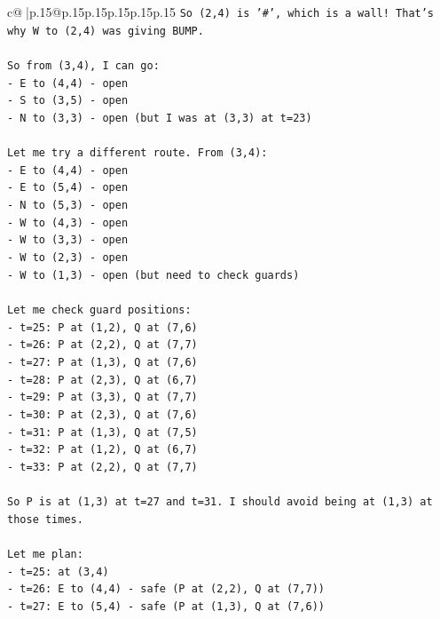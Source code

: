 \documentclass{article}
\begin{document}
{\begin{supertabular}{c@{$\;$}|p{.15\linewidth}@{}p{.15\linewidth}p{.15\linewidth}p{.15\linewidth}p{.15\linewidth}p{.15\linewidth}}
{{{\texttt{So (2,4) is '\#', which is a wall! That's why W to (2,4) was giving BUMP.} \\
\\ 
\texttt{So from (3,4), I can go:} \\
\texttt{{-} E to (4,4) {-} open} \\
\texttt{{-} S to (3,5) {-} open} \\
\texttt{{-} N to (3,3) {-} open (but I was at (3,3) at t=23)} \\
\\ 
\texttt{Let me try a different route. From (3,4):} \\
\texttt{{-} E to (4,4) {-} open} \\
\texttt{{-} E to (5,4) {-} open} \\
\texttt{{-} N to (5,3) {-} open} \\
\texttt{{-} W to (4,3) {-} open} \\
\texttt{{-} W to (3,3) {-} open} \\
\texttt{{-} W to (2,3) {-} open} \\
\texttt{{-} W to (1,3) {-} open (but need to check guards)} \\
\\ 
\texttt{Let me check guard positions:} \\
\texttt{{-} t=25: P at (1,2), Q at (7,6)} \\
\texttt{{-} t=26: P at (2,2), Q at (7,7)} \\
\texttt{{-} t=27: P at (1,3), Q at (7,6)} \\
\texttt{{-} t=28: P at (2,3), Q at (6,7)} \\
\texttt{{-} t=29: P at (3,3), Q at (7,7)} \\
\texttt{{-} t=30: P at (2,3), Q at (7,6)} \\
\texttt{{-} t=31: P at (1,3), Q at (7,5)} \\
\texttt{{-} t=32: P at (1,2), Q at (6,7)} \\
\texttt{{-} t=33: P at (2,2), Q at (7,7)} \\
\\ 
\texttt{So P is at (1,3) at t=27 and t=31. I should avoid being at (1,3) at those times.} \\
\\ 
\texttt{Let me plan:} \\
\texttt{{-} t=25: at (3,4)} \\
\texttt{{-} t=26: E to (4,4) {-} safe (P at (2,2), Q at (7,7))} \\
\texttt{{-} t=27: E to (5,4) {-} safe (P at (1,3), Q at (7,6))} \\
}}}
\end{supertabular}}
\end{document}
